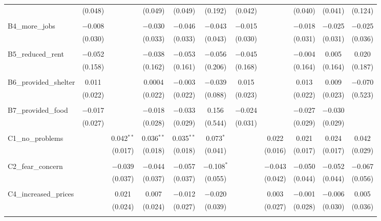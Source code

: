 \begin{table}[H]
\begin{tabular}{@{\extracolsep{4pt}}lcccccccccc}
  & (0.048) &  & (0.049) & (0.049) & (0.192) & (0.042) &  & (0.040) & (0.041) & (0.124) \\ 
  & & & & & & & & & & \\ 
 B4\_more\_jobs & $-$0.008 &  & $-$0.030 & $-$0.046 & $-$0.043 & $-$0.015 &  & $-$0.018 & $-$0.025 & $-$0.025 \\ 
  & (0.030) &  & (0.033) & (0.033) & (0.043) & (0.030) &  & (0.031) & (0.031) & (0.036) \\ 
  & & & & & & & & & & \\ 
 B5\_reduced\_rent & $-$0.052 &  & $-$0.038 & $-$0.053 & $-$0.056 & $-$0.045 &  & $-$0.004 & 0.005 & 0.020 \\ 
  & (0.158) &  & (0.162) & (0.161) & (0.206) & (0.168) &  & (0.164) & (0.164) & (0.187) \\ 
  & & & & & & & & & & \\ 
 B6\_provided\_shelter & 0.011 &  & 0.0004 & $-$0.003 & $-$0.039 & 0.015 &  & 0.013 & 0.009 & $-$0.070 \\ 
  & (0.022) &  & (0.022) & (0.022) & (0.088) & (0.023) &  & (0.022) & (0.023) & (0.523) \\ 
  & & & & & & & & & & \\ 
 B7\_provided\_food & $-$0.017 &  & $-$0.018 & $-$0.033 & 0.156 & $-$0.024 &  & $-$0.027 & $-$0.030 &  \\ 
  & (0.027) &  & (0.028) & (0.029) & (0.544) & (0.031) &  & (0.029) & (0.029) &  \\ 
  & & & & & & & & & & \\ 
 C1\_no\_problems &  & 0.042$^{**}$ & 0.036$^{**}$ & 0.035$^{**}$ & 0.073$^{*}$ &  & 0.022 & 0.021 & 0.024 & 0.042 \\ 
  &  & (0.017) & (0.018) & (0.018) & (0.041) &  & (0.016) & (0.017) & (0.017) & (0.029) \\ 
  & & & & & & & & & & \\ 
 C2\_fear\_concern &  & $-$0.039 & $-$0.044 & $-$0.057 & $-$0.108$^{*}$ &  & $-$0.043 & $-$0.050 & $-$0.052 & $-$0.067 \\ 
  &  & (0.037) & (0.037) & (0.037) & (0.055) &  & (0.042) & (0.044) & (0.044) & (0.056) \\ 
  & & & & & & & & & & \\ 
 C4\_increased\_prices &  & 0.021 & 0.007 & $-$0.012 & $-$0.020 &  & 0.003 & $-$0.001 & $-$0.006 & 0.005 \\ 
  &  & (0.024) & (0.024) & (0.027) & (0.039) &  & (0.027) & (0.028) & (0.030) & (0.036) \\ 
  & & & & & & & & & & \\ 

\end{tabular}
\end{table}
